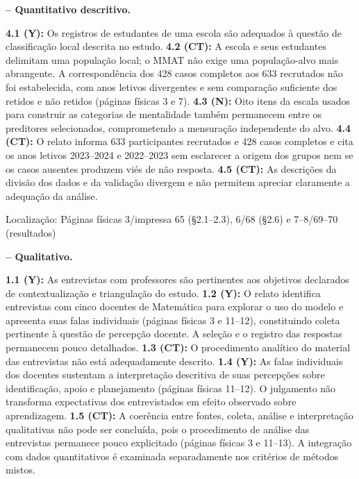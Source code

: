 
\noindent\textbf{ -- Quantitativo descritivo.}\nopagebreak[4]

\textbf{4.1 (Y):} Os registros de estudantes de uma escola são adequados à questão de classificação local descrita no estudo. \textbf{4.2 (CT):} A escola e seus estudantes delimitam uma população local; o MMAT não exige uma população-alvo mais abrangente. A correspondência dos 428 casos completos aos 633 recrutados não foi estabelecida, com anos letivos divergentes e sem comparação suficiente dos retidos e não retidos (páginas físicas 3 e 7). \textbf{4.3 (N):} Oito itens da escala usados para construir as categorias de mentalidade também permanecem entre os preditores selecionados, comprometendo a mensuração independente do alvo. \textbf{4.4 (CT):} O relato informa 633 participantes recrutados e 428 casos completos e cita os anos letivos 2023–2024 e 2022–2023 sem esclarecer a origem dos grupos nem se os casos ausentes produzem viés de não resposta. \textbf{4.5 (CT):} As descrições da divisão dos dados e da validação divergem e não permitem apreciar claramente a adequação da análise.

\noindent Localização: Páginas físicas 3/\allowbreak{}impressa 65 (§2.1–2.3), 6/\allowbreak{}68 (§2.6) e 7–8/\allowbreak{}69–70 (resultados)\par

\noindent\textbf{ -- Qualitativo.}\nopagebreak[4]

\textbf{1.1 (Y):} As entrevistas com professores são pertinentes aos objetivos declarados de contextualização e triangulação do estudo. \textbf{1.2 (Y):} O relato identifica entrevistas com cinco docentes de Matemática para explorar o uso do modelo e apresenta suas falas individuais (páginas físicas 3 e 11–12), constituindo coleta pertinente à questão de percepção docente. A seleção e o registro das respostas permanecem pouco detalhados. \textbf{1.3 (CT):} O procedimento analítico do material das entrevistas não está adequadamente descrito. \textbf{1.4 (Y):} As falas individuais dos docentes sustentam a interpretação descritiva de suas percepções sobre identificação, apoio e planejamento (páginas físicas 11–12). O julgamento não transforma expectativas dos entrevistados em efeito observado sobre aprendizagem. \textbf{1.5 (CT):} A coerência entre fontes, coleta, análise e interpretação qualitativas não pode ser concluída, pois o procedimento de análise das entrevistas permanece pouco explicitado (páginas físicas 3 e 11–13). A integração com dados quantitativos é examinada separadamente nos critérios de métodos mistos.

